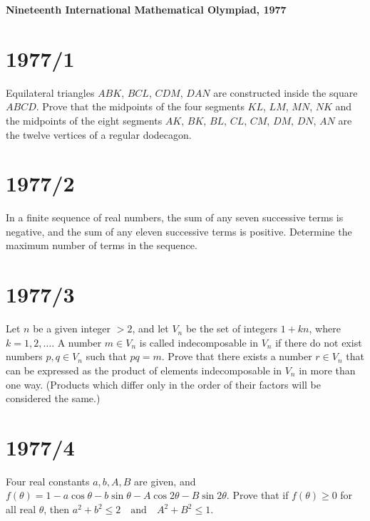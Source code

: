 \documentclass[12pt]{article}
\date{\tdoady}
\begin{document}
\thispagestyle{fancy}
\fancyhf{} %
\renewcommand{\headrulewidth}{0pt} %
\fancyfoot[C]{\thepage} %
\vspace*{1cm}
\textbf{Nineteenth International Mathematical Olympiad, 1977}
\section*{1977/1}
Equilateral triangles $ABK$, $BCL$, $CDM$, $DAN$ are constructed inside the square $ABCD$.  
Prove that the midpoints of the four segments $KL$, $LM$, $MN$, $NK$ and the midpoints of the eight segments $AK$, $BK$, $BL$, $CL$, $CM$, $DM$, $DN$, $AN$ are the twelve vertices of a regular dodecagon.

\section*{1977/2}
In a finite sequence of real numbers, the sum of any seven successive terms is negative,  
and the sum of any eleven successive terms is positive.  
Determine the maximum number of terms in the sequence.

\section*{1977/3}
Let $n$ be a given integer $> 2$, and let $V_n$ be the set of integers $1 + kn$, where $k = 1, 2, \dots$.  
A number $m \in V_n$ is called indecomposable in $V_n$ if there do not exist numbers $p, q \in V_n$ such that $pq = m$.  
Prove that there exists a number $r \in V_n$ that can be expressed as the product of elements indecomposable in $V_n$ in more than one way.  
(Products which differ only in the order of their factors will be considered the same.)

\section*{1977/4}
Four real constants $a, b, A, B$ are given, and
$
f(\theta) = 1 - a \cos \theta - b \sin \theta - A \cos 2\theta - B \sin 2\theta.
$
Prove that if $f(\theta) \ge 0$ for all real $\theta$, then
$
a^2 + b^2 \le 2 \quad \text{and} \quad A^2 + B^2 \le 1.
$
\end{document}
